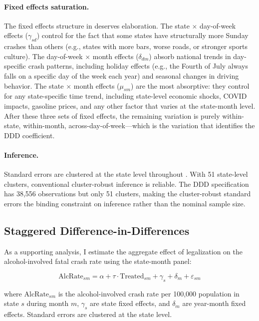 \documentclass[12pt]{article}
\begin{document}
\paragraph{Fixed effects saturation.} The fixed effects structure in  deserves elaboration. The state $\times$ day-of-week effects ($\gamma_{sd}$) control for the fact that some states have structurally more Sunday crashes than others (e.g., states with more bars, worse roads, or stronger sports culture). The day-of-week $\times$ month effects ($\delta_{dm}$) absorb national trends in day-specific crash patterns, including holiday effects (e.g., the Fourth of July always falls on a specific day of the week each year) and seasonal changes in driving behavior. The state $\times$ month effects ($\mu_{sm}$) are the most absorptive: they control for any state-specific time trend, including state-level economic shocks, COVID impacts, gasoline prices, and any other factor that varies at the state-month level. After these three sets of fixed effects, the remaining variation is purely within-state, within-month, across-day-of-week---which is the variation that identifies the DDD coefficient.

\paragraph{Inference.} Standard errors are clustered at the state level throughout \citep{cameron2015practitioners}. With 51 state-level clusters, conventional cluster-robust inference is reliable. The DDD specification has 38,556 observations but only 51 clusters, making the cluster-robust standard errors the binding constraint on inference rather than the nominal sample size.

\subsection{Staggered Difference-in-Differences}

As a supporting analysis, I estimate the aggregate effect of legalization on the alcohol-involved fatal crash rate using the state-month panel:

\begin{equation}
\text{AlcRate}_{sm} = \alpha + \tau \cdot \text{Treated}_{sm} + \gamma_s + \delta_m + \varepsilon_{sm}
\label{eq:twfe}
\end{equation}

\noindent where $\text{AlcRate}_{sm}$ is the alcohol-involved crash rate per 100,000 population in state $s$ during month $m$, $\gamma_s$ are state fixed effects, and $\delta_m$ are year-month fixed effects. Standard errors are clustered at the state level.
\end{document}
